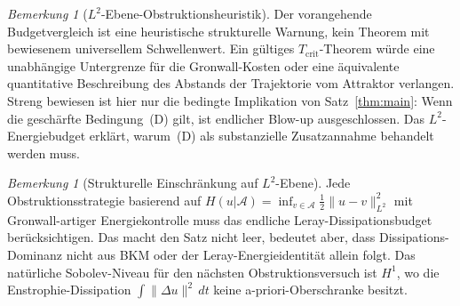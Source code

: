 \documentclass[12pt,a4paper]{article}
\theoremstyle{definition}
\theoremstyle{plain}
\theoremstyle{remark}
\newtheorem{remark}[definition]{Bemerkung}
\begin{document}
\begin{remark}[$L^2$-Ebene-Obstruktionsheuristik]\label{thm:L2-obstruction}
Der vorangehende Budgetvergleich ist eine heuristische strukturelle
Warnung, kein Theorem mit bewiesenem universellem Schwellenwert. Ein
gültiges $T_{\mathrm{crit}}$-Theorem würde eine unabhängige Untergrenze
für die Gronwall-Kosten oder eine äquivalente quantitative Beschreibung
des Abstands der Trajektorie vom Attraktor verlangen. Streng bewiesen ist
hier nur die bedingte Implikation von Satz~\ref{thm:main}: Wenn die
geschärfte Bedingung~(D) gilt, ist endlicher Blow-up ausgeschlossen. Das
$L^2$-Energiebudget erklärt, warum~(D) als substanzielle Zusatzannahme
behandelt werden muss.
\end{remark}

\begin{remark}[Strukturelle Einschränkung auf $L^2$-Ebene]\label{cor:L2-limitation}
Jede Obstruktionsstrategie basierend auf
$H(u|\mathcal{A}) = \inf_{v \in \mathcal{A}}\frac{1}{2}\|u-v\|_{L^2}^2$
mit Gronwall-artiger Energiekontrolle muss das endliche
Leray-Dissipationsbudget berücksichtigen. Das macht den Satz nicht leer,
bedeutet aber, dass Dissipations-Dominanz nicht aus BKM oder der
Leray-Energieidentität allein folgt. Das natürliche Sobolev-Niveau für
den nächsten Obstruktionsversuch ist $H^1$, wo die
Enstrophie-Dissipation $\int\|\Delta u\|^2\,dt$ keine
a-priori-Oberschranke besitzt.
\end{remark}
\end{document}
